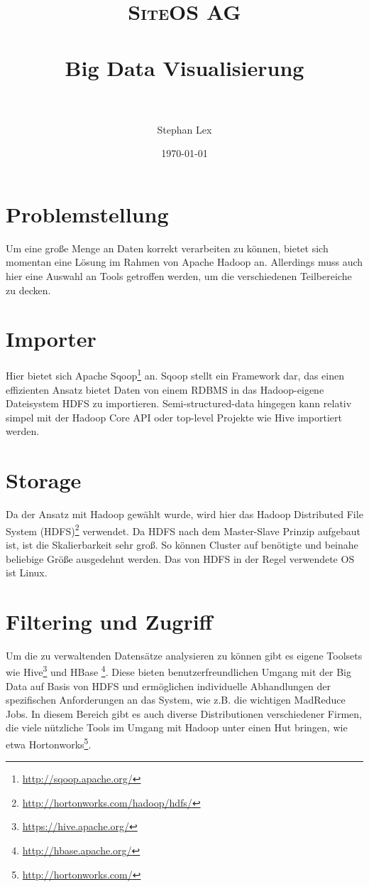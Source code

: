 \documentclass[paper=a4, fontsize=11pt]{scrartcl}
\title{	
\normalfont \normalsize 
\textsc{SiteOS AG} \\ [10pt] %
\horrule{0.5pt} \\[0.4cm] %
\huge Big Data Visualisierung \\ %
\horrule{2pt} \\[0.5cm] %
}
\author{Stephan Lex} %
\date{\normalsize\today} %
\begin{document}
\maketitle %


\section*{Problemstellung}
Um eine gro\ss{}e Menge an Daten korrekt verarbeiten zu k\"onnen, bietet sich momentan eine L\"osung im Rahmen von Apache Hadoop an. Allerdings muss auch hier eine Auswahl an Tools getroffen werden, um die verschiedenen Teilbereiche zu decken.

\section*{Importer}
Hier bietet sich Apache Sqoop\footnote{\url{http://sqoop.apache.org/}} an. Sqoop stellt ein Framework dar, das einen effizienten Ansatz bietet Daten von einem RDBMS in das Hadoop-eigene Dateisystem HDFS zu importieren. Semi-structured-data hingegen kann relativ simpel mit der Hadoop Core API oder top-level Projekte wie Hive importiert werden.

\section*{Storage}
Da der Ansatz mit Hadoop gew\"ahlt wurde, wird hier das Hadoop Distributed File System (HDFS)\footnote{\url{http://hortonworks.com/hadoop/hdfs/}} verwendet. Da HDFS nach dem Master-Slave Prinzip aufgebaut ist, ist die Skalierbarkeit sehr gro\ss{}. So k\"onnen Cluster auf ben\"otigte und beinahe beliebige Gr\"o\ss{}e ausgedehnt werden. Das von HDFS in der Regel verwendete OS ist Linux. 

\section*{Filtering und Zugriff}
Um die zu verwaltenden Datens\"atze analysieren zu k\"onnen gibt es eigene Toolsets wie Hive\footnote{\url{https://hive.apache.org/}} und HBase \footnote{\url{http://hbase.apache.org/}}. Diese bieten benutzerfreundlichen Umgang mit der Big Data auf Basis von HDFS und erm\"oglichen individuelle Abhandlungen der spezifischen Anforderungen an das System, wie z.B. die wichtigen MadReduce Jobs. In diesem Bereich gibt es auch diverse Distributionen verschiedener Firmen, die viele n\"utzliche Tools im Umgang mit Hadoop unter einen Hut bringen, wie etwa Hortonworks\footnote{\url{http://hortonworks.com/}}.
\end{document}
